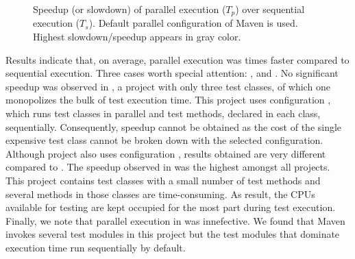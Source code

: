 \begin{figure}[h!]
\centering
{}
\caption{Speedup (or slowdown) of parallel execution ($T_p$) over
  sequential execution ($T_s$).  Default parallel configuration of
  Maven is used.  Highest slowdown/speedup appears in gray color.}
\label{tab:speedup}
\end{figure}

Results indicate that, on average, parallel execution was
\avgSpeedup{} times faster compared to sequential execution.  Three
cases worth special attention: ,  and
.  No significant speedup was observed in
, a project with only three test classes, of which one
monopolizes the bulk of test execution time.  This project uses
configuration \ParClassSeqMeth{}, which runs test classes in parallel
and test methods, declared in each class, sequentially.  Consequently,
speedup cannot be obtained as the cost of the single expensive test
class cannot be broken down with the selected configuration.  Although
project  also uses configuration \ParClassSeqMeth{},
results obtained are very different compared to .  The
speedup observed in  was the highest amongst all
projects.  This project contains test classes with a small number of
test methods and several methods in those classes are time-consuming.
As result, the CPUs available for testing are kept occupied for the
most part during test execution.  Finally, we note that parallel
execution in  was innefective.  We found that Maven
invokes several test modules in this project but the test modules that
dominate execution time run sequentially by default.

